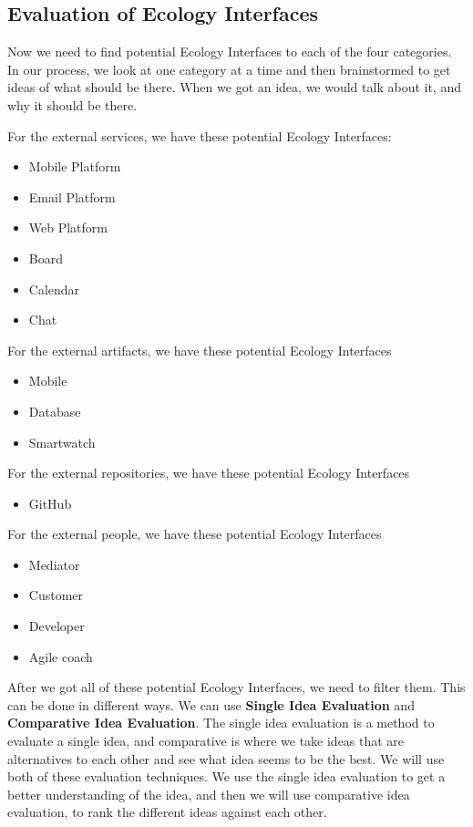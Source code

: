 \subsection{Evaluation of Ecology Interfaces}

Now we need to find potential Ecology Interfaces to each of the four categories.
In our process, we look at one category at a time and then brainstormed to get ideas of what should be there.
When we got an idea, we would talk about it, and why it should be there.

For the external services, we have these potential Ecology Interfaces:

\begin{itemize}
    \item Mobile Platform
    \item Email Platform
    \item Web Platform
    \item Board
    \item Calendar
    \item Chat 
\end{itemize}

For the external artifacts, we have these potential Ecology Interfaces

\begin{itemize}
    \item Mobile
    \item Database
    \item Smartwatch
\end{itemize}

For the external repositories, we have these potential Ecology Interfaces

\begin{itemize}
    \item GitHub
\end{itemize}

For the external people, we have these potential Ecology Interfaces

\begin{itemize}
    \item Mediator
    \item Customer
    \item Developer
    \item Agile coach
\end{itemize}

After we got all of these potential Ecology Interfaces, we need to filter them.
This can be done in different ways.
We can use \textbf{Single Idea Evaluation} and \textbf{Comparative Idea Evaluation}.
The single idea evaluation is a method to evaluate a single idea, and comparative is where we take ideas that are alternatives to each other and see what idea seems to be the best.
We will use both of these evaluation techniques.
We use the single idea evaluation to get a better understanding of the idea, and then we will use comparative idea evaluation, to rank the different ideas against each other.

